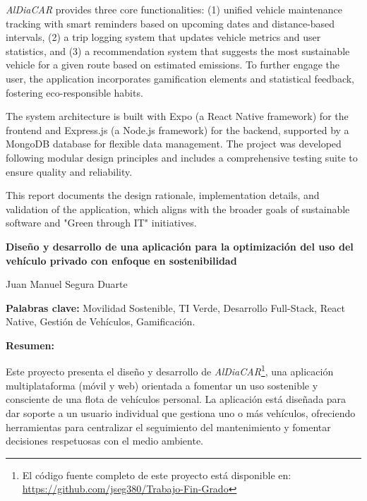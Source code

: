 \textit{AlDiaCAR} provides three core functionalities: (1) unified vehicle maintenance tracking with smart reminders based on upcoming dates and distance-based intervals, (2) a trip logging system that updates vehicle metrics and user statistics, and (3) a recommendation system that suggests the most sustainable vehicle for a given route based on estimated emissions. To further engage the user, the application incorporates gamification elements and statistical feedback, fostering eco-responsible habits.

\textgap

The system architecture is built with Expo (a React Native framework) for the frontend and Express.js (a Node.js framework) for the backend, supported by a MongoDB database for flexible data management. The project was developed following modular design principles and includes a comprehensive testing suite to ensure quality and reliability.

\textgap

This report documents the design rationale, implementation details, and validation of the application, which aligns with the broader goals of sustainable software and "Green through IT" initiatives.

\clearpage
\mbox{}
\newpage


\begin{center}
    {\large\bfseries Diseño y desarrollo de una aplicación para la optimización del uso del vehículo privado con enfoque en sostenibilidad}
\end{center}
\begin{center}
    Juan Manuel Segura Duarte
\end{center}

\begin{flushleft}
    \textbf{Palabras clave:} Movilidad Sostenible, TI Verde, Desarrollo Full-Stack, React Native, Gestión de Vehículos, Gamificación.
\end{flushleft}

\begin{flushleft}
    \textbf{Resumen:}
\end{flushleft}

Este proyecto presenta el diseño y desarrollo de \textit{AlDiaCAR}\footnote{El código fuente completo de este proyecto está disponible en: \url{https://github.com/jseg380/Trabajo-Fin-Grado}}, una aplicación multiplataforma (móvil y web) orientada a fomentar un uso sostenible y consciente de una flota de vehículos personal. La aplicación está diseñada para dar soporte a un usuario individual que gestiona uno o más vehículos, ofreciendo herramientas para centralizar el seguimiento del mantenimiento y fomentar decisiones respetuosas con el medio ambiente.

